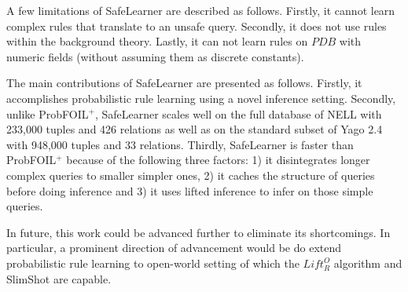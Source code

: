 \documentclass[akbc,twoside,11pt]{article}
\newcommand{\algorithmname}{SafeLearner\xspace}
\begin{document}
A few limitations of \algorithmname are described as follows. Firstly, it cannot learn complex rules that translate to an unsafe query. Secondly, it does not use rules within the background theory. %
Lastly, it can not learn rules on $PDB$ with numeric fields (without assuming them as discrete constants).

The main contributions of \algorithmname are presented as follows. Firstly, it accomplishes probabilistic rule learning using a novel inference setting. Secondly, unlike ProbFOIL$^+$, \algorithmname scales well on the full database of NELL with 233,000 tuples and 426 relations as well as on the standard subset of Yago 2.4 with 948,000 tuples and 33 relations. Thirdly, \algorithmname is faster than ProbFOIL$^+$ because of the following three factors: 1) it disintegrates longer complex queries to smaller simpler ones, 2) it caches the structure of queries before doing inference and 3) it uses lifted inference to infer on those simple queries. 

In future, this work could be advanced further to eliminate its shortcomings. In particular, a prominent direction of advancement would be do extend probabilistic rule learning to open-world setting of which the $Lift^O_R$ algorithm \cite{DBLP:conf/kr/CeylanDB16} and SlimShot are capable.



\end{document}
